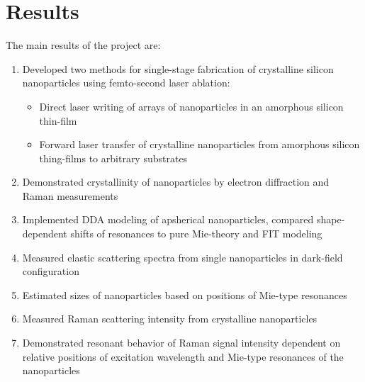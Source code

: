 \section*{Results}
    The main results of the project are:

    \begin{enumerate}
        \item Developed two methods for single-stage fabrication of crystalline silicon nanoparticles using femto-second laser ablation:
            \begin{itemize}
                \item Direct laser writing of arrays of nanoparticles in an amorphous silicon thin-film
                \item Forward laser transfer of crystalline nanoparticles from amorphous silicon thing-films to arbitrary substrates
            \end{itemize}
        \item Demonstrated crystallinity of nanoparticles by electron diffraction and Raman measurements
        \item Implemented DDA modeling of apsherical nanoparticles, compared shape-dependent shifts of resonances to pure Mie-theory
            and FIT modeling
        \item Measured elastic scattering spectra from single nanoparticles in dark-field configuration
        \item Estimated sizes of nanoparticles based on positions of Mie-type resonances
        \item Measured Raman scattering intensity from crystalline nanoparticles
        \item Demonstrated resonant behavior of Raman signal intensity dependent on relative positions of excitation wavelength and Mie-type resonances
            of the nanoparticles
    \end{enumerate}


